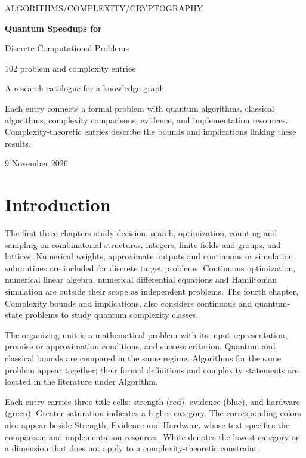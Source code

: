\documentclass[11pt,a4paper]{article}
\theoremstyle{problemstyle}
\begin{document}
\begin{titlepage}
\vspace*{24mm}
{\small ALGORITHMS\quad /\quad COMPLEXITY\quad /\quad CRYPTOGRAPHY\par}
\vspace{14mm}
{\Huge\bfseries Quantum Speedups for\par Discrete Computational Problems\par}
\vspace{12mm}
{\Large 102 problem and complexity entries\par}
\vspace{10mm}
{\large A research catalogue for a knowledge graph\par}
\vfill
Each entry connects a formal problem with quantum algorithms, classical algorithms, complexity comparisons, evidence, and implementation resources. Complexity-theoretic entries describe the bounds and implications linking these results.\par
\vspace{20mm}
{\large 9 November 2026\par}
\end{titlepage}

\section*{Introduction}
The first three chapters study decision, search, optimization, counting and sampling on combinatorial structures, integers, finite fields and groups, and lattices. Numerical weights, approximate outputs and continuous or simulation subroutines are included for discrete target problems. Continuous optimization, numerical linear algebra, numerical differential equations and Hamiltonian simulation are outside their scope as independent problems. The fourth chapter, Complexity bounds and implications, also considers continuous and quantum-state problems to study quantum complexity classes.

The organizing unit is a mathematical problem with its input representation, promise or approximation conditions, and success criterion. Quantum and classical bounds are compared in the same regime. Algorithms for the same problem appear together; their formal definitions and complexity statements are located in the literature under Algorithm.

Each entry carries three title cells: strength (red), evidence (blue), and hardware (green). Greater saturation indicates a higher category. The corresponding colors also appear beside Strength, Evidence and Hardware, whose text specifies the comparison and implementation resources. White denotes the lowest category or a dimension that does not apply to a complexity-theoretic constraint.
\end{document}

